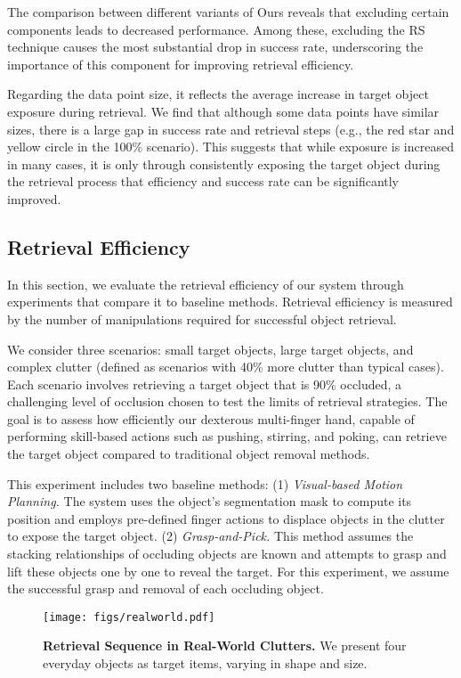 \documentclass[10pt, a4paper, logo, twocolumn, copyright]{psibot} %
\begin{document}
The comparison between different variants of Ours reveals that excluding certain components leads to decreased performance. Among these, excluding the RS technique causes the most substantial drop in success rate, underscoring the importance of this component for improving retrieval efficiency.

Regarding the data point size, it reflects the average increase in target object exposure during retrieval. We find that although some data points have similar sizes, there is a large gap in success rate and retrieval steps (e.g., the red star and yellow circle in the 100\% scenario). This suggests that while exposure is increased in many cases, it is only through consistently exposing the target object during the retrieval process that efficiency and success rate can be significantly improved.

\subsection{Retrieval Efficiency}
In this section, we evaluate the retrieval efficiency of our system through experiments that compare it to baseline methods. Retrieval efficiency is measured by the number of manipulations required for successful object retrieval.



We consider three scenarios: small target objects, large target objects, and complex clutter (defined as scenarios with 40\% more clutter than typical cases). Each scenario involves retrieving a target object that is 90\% occluded, a challenging level of occlusion chosen to test the limits of retrieval strategies. The goal is to assess how efficiently our dexterous multi-finger hand, capable of performing skill-based actions such as pushing, stirring, and poking, can retrieve the target object compared to traditional object removal methods.

This experiment includes two baseline methods:
(1) \textit{Visual-based Motion Planning.} The system uses the object’s segmentation mask to compute its position and employs pre-defined finger actions to displace objects in the clutter to expose the target object.
(2) \textit{Grasp-and-Pick.} This method assumes the stacking relationships of occluding objects are known and attempts to grasp and lift these objects one by one to reveal the target. For this experiment, we assume the successful grasp and removal of each occluding object.

\begin{figure*}
    \centering
    \texttt{[image: figs/realworld.pdf]}
    \caption{\textbf{Retrieval Sequence in Real-World Clutters.} We present four everyday objects as target items, varying in shape and size.}
    \label{fig:real_world_exp}   
\end{figure*}
\end{document}
